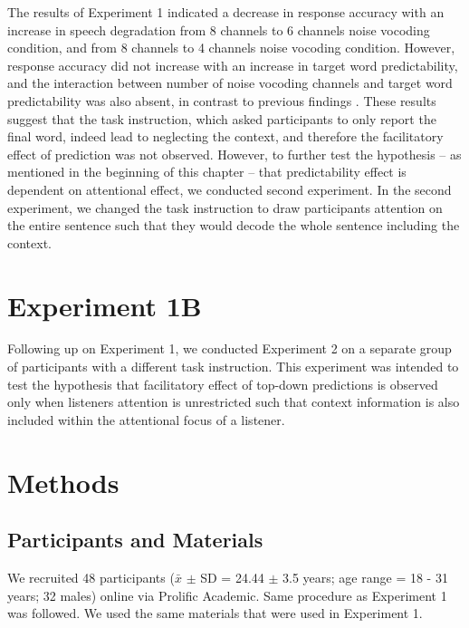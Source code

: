 \documentclass[a4paper, nobind]{templates/ociamthesis}
\begin{document}
The results of Experiment 1 indicated a decrease in response accuracy with an increase in speech degradation from 8 channels to 6 channels noise vocoding condition, and from 8 channels to 4 channels noise vocoding condition.
However, response accuracy did not increase with an increase in target word predictability,
and the interaction between number of noise vocoding channels and target word predictability was also absent, in contrast to previous findings \autocites{Obleser2007,Obleser2011}[see also][]{Hunter2018}.
These results suggest that the task instruction, which asked participants to only report the final word, indeed lead to neglecting the context, and therefore the facilitatory effect of prediction was not observed.
However, to further test the hypothesis -- as mentioned in the beginning of this chapter -- that predictability effect is dependent on attentional effect, we conducted second experiment.
In the second experiment, we changed the task instruction to draw participants attention on the entire sentence such that they would decode the whole sentence including the context.

\hypertarget{experiment-1b}{%
\section{Experiment 1B}\label{experiment-1b}}

Following up on Experiment 1, we conducted Experiment 2 on a separate group of participants with a different task instruction.
This experiment was intended to test the hypothesis that facilitatory effect of top-down predictions is observed only when listeners attention is unrestricted such that context information is also included within the attentional focus of a listener.

\hypertarget{methods-1}{%
\section{Methods}\label{methods-1}}

\hypertarget{participants-and-materials}{%
\subsection{Participants and Materials}\label{participants-and-materials}}

We recruited 48 participants (\(\bar{x}\) \(\pm\) SD = 24.44 \(\pm\) 3.5 years; age range = 18 - 31 years; 32 males) online via Prolific Academic.
Same procedure as Experiment 1 was followed.
We used the same materials that were used in Experiment 1.
\end{document}
